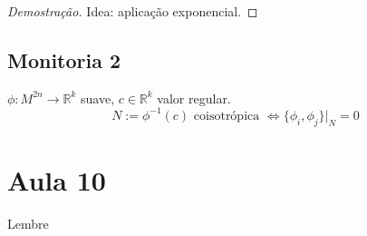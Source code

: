 \begin{proof}[Demostra\c c\~ao]
	Idea: aplica\c c\~ao exponencial.
\end{proof}

\subsection{Monitoria 2}

\begin{prop}
	$\phi:M^{2n}\to \mathbb{R}^{k}$ suave, $c \in\mathbb{R}^{k}$ valor regular.
	 \[N:=\phi^{-1}(c) \text{ coisotr\'opica }\iff \{\phi_i,\phi_j\} |_{N}=0 \]
\end{prop}


\section{Aula 10}

Lembre

